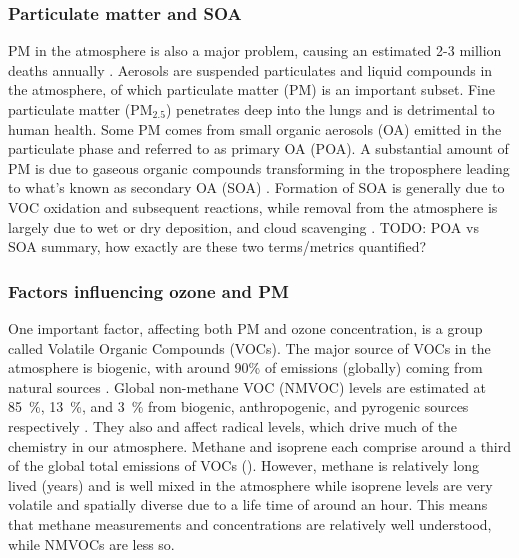     \subsubsection{Particulate matter and SOA}
      PM in the atmosphere is also a major problem, causing an estimated 2-3 million deaths annually \citep{Hoek2013, Krewski2009, Silva2013, Lelieveld2015}. 
      Aerosols are suspended particulates and liquid compounds in the atmosphere, of which particulate matter (PM) is an important subset.
      Fine particulate matter (PM$_{2.5}$) penetrates deep into the lungs and is detrimental to human health.
      Some PM comes from small organic aerosols (OA) emitted in the particulate phase and referred to as primary OA (POA).
      A substantial amount of PM is due to gaseous organic compounds transforming in the troposphere leading to what's known as secondary OA (SOA) \citep{Kroll2008}.
      Formation of SOA is generally due to VOC oxidation and subsequent reactions, while removal from the atmosphere is largely due to wet or dry deposition, and cloud scavenging \citep{Kanakidou2005}.
      TODO: POA vs SOA summary, how exactly are these two terms/metrics quantified?
    
    
    \subsubsection{Factors influencing ozone and PM}
      
      One important factor, affecting both PM and ozone concentration, is a group called Volatile Organic Compounds (VOCs).
      The major source of VOCs in the atmosphere is biogenic, with around 90\% of emissions (globally) coming from natural sources \citep{Guenther1995,Guenther2006, Millet2006}.
      Global non-methane VOC (NMVOC) levels are estimated at 85~\%, 13~\%, and 3~\% from biogenic, anthropogenic, and pyrogenic sources respectively \citep{Kefauver2014}.
      They also and affect radical levels, which drive much of the chemistry in our atmosphere.
      Methane and isoprene each comprise around a third of the global total emissions of VOCs (\cite{Guenther2006}).
      However, methane is relatively long lived (years) and is well mixed in the atmosphere while isoprene levels are very volatile and spatially diverse due to a life time of around an hour.
      This means that methane measurements and concentrations are relatively well understood, while NMVOCs are less so.
      
